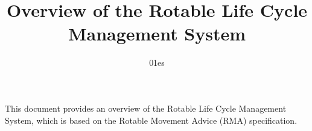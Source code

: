 \begin{titlepage}
\title{Overview of the Rotable Life Cycle Management System}
\author{01es}
\maketitle
\clearpage
\tableofcontents
\clearpage
This document provides an overview of the Rotable Life Cycle Management System, which is based on the Rotable Movement Advice (RMA) specification.
\end{titlepage}